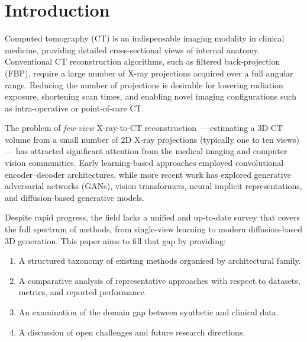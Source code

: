 
\section{Introduction}
\label{sec:introduction}

Computed tomography (CT) is an indispensable imaging modality in clinical medicine, providing detailed cross-sectional views of internal anatomy. Conventional CT reconstruction algorithms, such as filtered back-projection (FBP), require a large number of X-ray projections acquired over a full angular range. Reducing the number of projections is desirable for lowering radiation exposure, shortening scan times, and enabling novel imaging configurations such as intra-operative or point-of-care CT.

The problem of \textit{few-view} X-ray-to-CT reconstruction — estimating a 3D CT volume from a small number of 2D X-ray projections (typically one to ten views) — has attracted significant attention from the medical imaging and computer vision communities. Early learning-based approaches employed convolutional encoder--decoder architectures, while more recent work has explored generative adversarial networks (GANs), vision transformers, neural implicit representations, and diffusion-based generative models.

Despite rapid progress, the field lacks a unified and up-to-date survey that covers the full spectrum of methods, from single-view learning to modern diffusion-based 3D generation. This paper aims to fill that gap by providing:

\begin{enumerate}[label=(\roman*)]
  \item A structured taxonomy of existing methods organised by architectural family.
  \item A comparative analysis of representative approaches with respect to datasets, metrics, and reported performance.
  \item An examination of the domain gap between synthetic and clinical data.
  \item A discussion of open challenges and future research directions.
\end{enumerate}

